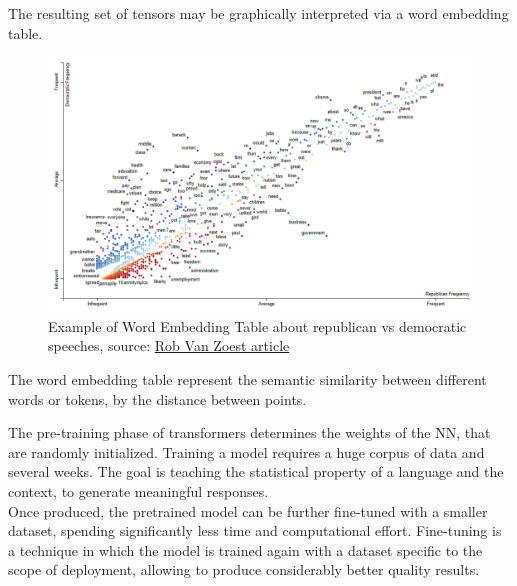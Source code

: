 \documentclass[12pt]{article}
\begin{document}
\vspace{2mm}

The resulting set of tensors may be graphically interpreted via a word embedding table.
    \begin{figure}[H]
    \centering
            \includegraphics[width=1.3\textwidth]{WordEmbeddingTableEx.png}
    \caption{Example of Word Embedding Table about republican vs democratic speeches, source: \href{https://www.innerdoc.com/periodic-table-of-nlp-tasks/78-word-embedding-visualization/}{Rob Van Zoest article}}
    \end{figure}
\noindent The word embedding table represent the semantic similarity between different words or tokens, by the distance between points.


\vspace{2mm}

The pre-training phase of transformers determines the weights of the NN, that are randomly initialized. Training a model requires a huge corpus of data and several weeks. The goal is teaching the statistical property of a language and the context, to generate meaningful responses.\\ 
Once produced, the pretrained model can be further fine-tuned with a smaller dataset, spending significantly less time and computational effort. Fine-tuning is a technique in which the model is trained again with a dataset specific to the scope of deployment, allowing to produce considerably better quality results.\\
\end{document}
